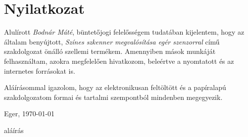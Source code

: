 \documentclass{thesis-ekf}
\begin{document}
\chapter*{Nyilatkozat}
\thispagestyle{empty}

Alulírott \emph{Bodnár Máté}, büntetőjogi felelősségem tudatában kijelentem, hogy az általam benyújtott, \emph{Színes szkenner megvalósítása egér szenzorral} című szakdolgozat önálló szellemi termékem. Amennyiben mások munkáját felhasználtam, azokra megfelelően hivatkozom, beleértve a nyomtatott és az internetes forrásokat is.

Aláírásommal igazolom, hogy az elektronikusan feltöltött és a papíralapú szakdolgozatom formai és tartalmi szempontból mindenben megegyezik.

\bigskip
\begin{flushleft}
Eger, \today
\end{flushleft}

\bigskip
\begin{flushright}
aláírás\hspace{3cm}\mbox{}
\end{flushright}

\end{document}
